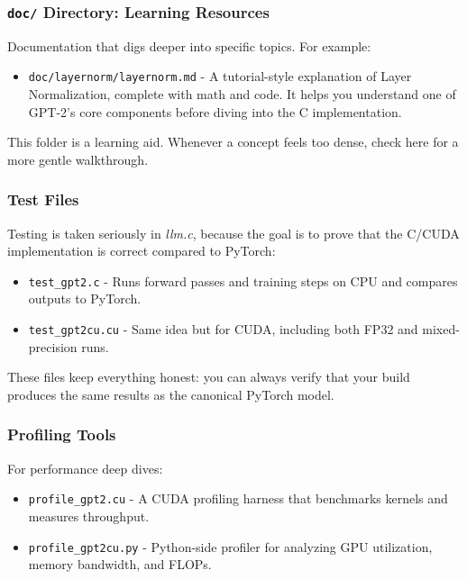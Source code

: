\documentclass[
  letterpaper,
  DIV=11,
  numbers=noendperiod]{scrreprt}
\providecommand{\tightlist}{%
  \setlength{\itemsep}{0pt}\setlength{\parskip}{0pt}}
\begin{document}
\subsubsection{\texorpdfstring{\texttt{doc/} Directory: Learning
Resources}{doc/ Directory: Learning Resources}}\label{doc-directory-learning-resources}

Documentation that digs deeper into specific topics. For example:

\begin{itemize}
\tightlist
\item
  \texttt{doc/layernorm/layernorm.md} - A tutorial-style explanation of
  Layer Normalization, complete with math and code. It helps you
  understand one of GPT-2's core components before diving into the C
  implementation.
\end{itemize}

This folder is a learning aid. Whenever a concept feels too dense, check
here for a more gentle walkthrough.

\subsubsection{Test Files}\label{test-files}

Testing is taken seriously in \emph{llm.c}, because the goal is to prove
that the C/CUDA implementation is correct compared to PyTorch:

\begin{itemize}
\tightlist
\item
  \texttt{test\_gpt2.c} - Runs forward passes and training steps on CPU
  and compares outputs to PyTorch.
\item
  \texttt{test\_gpt2cu.cu} - Same idea but for CUDA, including both FP32
  and mixed-precision runs.
\end{itemize}

These files keep everything honest: you can always verify that your
build produces the same results as the canonical PyTorch model.

\subsubsection{Profiling Tools}\label{profiling-tools}

For performance deep dives:

\begin{itemize}
\tightlist
\item
  \texttt{profile\_gpt2.cu} - A CUDA profiling harness that benchmarks
  kernels and measures throughput.
\item
  \texttt{profile\_gpt2cu.py} - Python-side profiler for analyzing GPU
  utilization, memory bandwidth, and FLOPs.
\end{itemize}
\end{document}
